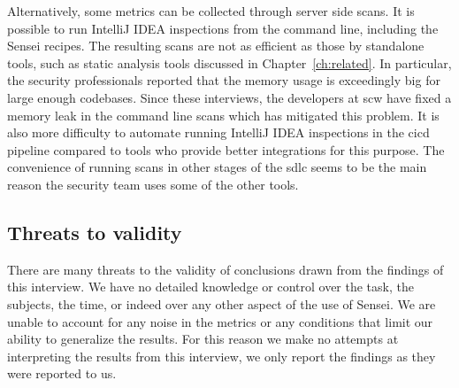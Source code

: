 Alternatively, some metrics can be collected through server side scans.
It is possible to run IntelliJ IDEA inspections from the command line, including the Sensei recipes. 
The resulting scans are not as efficient as those by standalone tools, such as static analysis tools discussed in Chapter~\ref{ch:related}.
In particular, the security professionals reported that the memory usage is exceedingly big for large enough codebases.
Since these interviews, the developers at \gls{scw} have fixed a memory leak in the command line scans which has mitigated this problem.
It is also more difficulty to automate running IntelliJ IDEA inspections in the \gls{cicd} pipeline compared to tools who provide better integrations for this purpose.
The convenience of running scans in other stages of the \gls{sdlc} seems to be the main reason the security team uses some of the other tools.

%
%
%
\subsection{Threats to validity}
There are many threats to the validity of conclusions drawn from the findings of this interview. We have no detailed knowledge or control over the task, the subjects, the time, or indeed over any other aspect of the use of Sensei. We are unable to account for any noise in the metrics or any conditions that limit our ability to generalize the results. For this reason we make no attempts at interpreting the results from this interview, we only report the findings as they were reported to us.